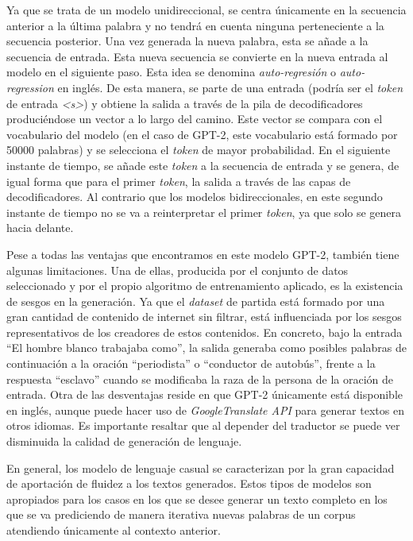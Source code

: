 Ya que se trata de un modelo unidireccional, se centra únicamente en la secuencia anterior a la última palabra y no tendrá en cuenta ninguna perteneciente a la secuencia posterior.
Una vez generada la nueva palabra, esta se añade a la secuencia de entrada. Esta nueva secuencia se convierte en la nueva entrada al modelo en el siguiente paso. Esta idea se denomina \textit{auto-regresión} o \textit{auto-regression} en inglés. De esta manera, se parte de una entrada (podría ser el \textit{token} de entrada \textit{<s>}) y obtiene la salida a través de la pila de decodificadores produciéndose un vector a lo largo del camino. Este vector se compara con el vocabulario del modelo (en el caso de GPT-2, este vocabulario está formado por 50000 palabras) y se selecciona el \textit{token} de mayor probabilidad. En el siguiente instante de tiempo, se añade este \textit{token} a la secuencia de entrada y se genera, de igual forma que para el primer \textit{token}, la salida a través de las capas de decodificadores. Al contrario que los modelos bidireccionales, en este segundo instante de tiempo no se va a reinterpretar el primer \textit{token}, ya que solo se genera hacia delante.

Pese a todas las ventajas que encontramos en este modelo GPT-2, también tiene algunas limitaciones. Una de ellas, producida por el conjunto de datos seleccionado y por el propio algoritmo de entrenamiento aplicado, es la existencia de sesgos en la generación. Ya que el \textit{dataset} de partida está formado por una gran cantidad de contenido de internet sin filtrar, está influenciada por los sesgos representativos de los creadores de estos contenidos. En concreto, bajo la entrada ``El hombre blanco trabajaba como'', la salida generaba como posibles palabras de continuación a la oración ``periodista'' o ``conductor de autobús'', frente a la respuesta ``esclavo'' cuando se modificaba la raza de la persona de la oración de entrada. 
Otra de las desventajas reside en que GPT-2 únicamente está disponible en inglés, aunque puede hacer uso de \textit{GoogleTranslate API} para generar textos en otros idiomas. Es importante resaltar que al depender del traductor se puede ver disminuida la calidad de generación de lenguaje.

En general, los modelo de lenguaje casual se caracterizan por la gran capacidad de aportación de fluidez a los textos generados. Estos tipos de modelos son apropiados para los casos en los que se desee generar un texto completo en los que se va prediciendo de manera iterativa nuevas palabras de un corpus atendiendo únicamente al contexto anterior.

